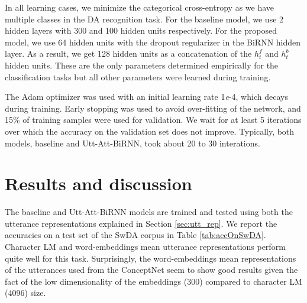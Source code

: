 \documentclass[a4paper]{article}
\begin{document}
In all learning cases, we minimize the categorical cross-entropy as we have multiple classes in the DA recognition task. 
For the baseline model, we use 2 hidden layers with 300 and 100 hidden units respectively. For the proposed model, we use 64 hidden units with the dropout regularizer \cite{hinton2012improving} in the BiRNN hidden layer. As a result, we get 128 hidden units as a concatenation of the $h_{t}^{f}$ and $h_{t}^{b}$ hidden units. 
These are the only parameters determined empirically for the classification tasks but all other parameters were learned during training.

The Adam optimizer \cite{kingma2014adam} was used with an initial learning rate 1\textit{e}-4, which decays during training.
Early stopping was used to avoid over-fitting of the network, and 15\% of training samples were used for validation. 
We wait for at least 5 iterations over which the accuracy on the validation set does not improve.
Typically, both models, baseline and Utt-Att-BiRNN, took about 20 to 30 interations.

\section{Results and discussion}

The baseline and Utt-Att-BiRNN models are trained and tested using both the utterance representations explained in Section \ref{sec:utt_rep}. 
We report the accuracies on a test set of the SwDA corpus in Table \ref{tab:accOnSwDA}. 
Character LM and word-embeddings mean utterance representations perform quite well for this task. 
Surprisingly, the word-embeddings mean representations of the utterances used from the ConceptNet seem to show good results given the fact of the low dimensionality of the embeddings (300) compared to character LM (4096) size.
\end{document}
